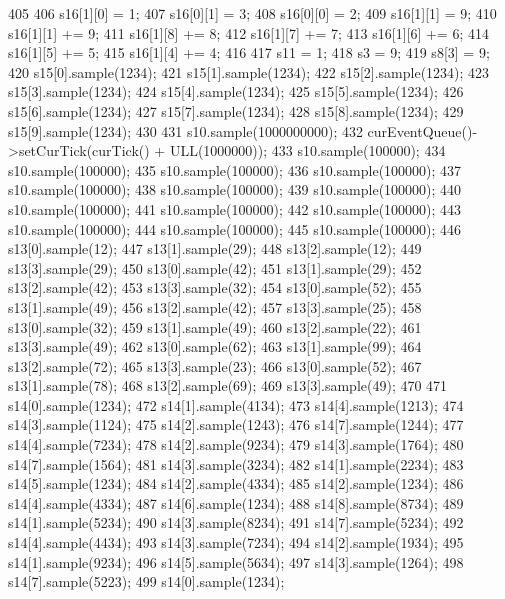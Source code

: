 \begin{DoxyCode}
405 {
406     s16[1][0] = 1;
407     s16[0][1] = 3;
408     s16[0][0] = 2;
409     s16[1][1] = 9;
410     s16[1][1] += 9;
411     s16[1][8] += 8;
412     s16[1][7] += 7;
413     s16[1][6] += 6;
414     s16[1][5] += 5;
415     s16[1][4] += 4;
416 
417     s11 = 1;
418     s3 = 9;
419     s8[3] = 9;
420     s15[0].sample(1234);
421     s15[1].sample(1234);
422     s15[2].sample(1234);
423     s15[3].sample(1234);
424     s15[4].sample(1234);
425     s15[5].sample(1234);
426     s15[6].sample(1234);
427     s15[7].sample(1234);
428     s15[8].sample(1234);
429     s15[9].sample(1234);
430 
431     s10.sample(1000000000);
432     curEventQueue()->setCurTick(curTick() + ULL(1000000));
433     s10.sample(100000);
434     s10.sample(100000);
435     s10.sample(100000);
436     s10.sample(100000);
437     s10.sample(100000);
438     s10.sample(100000);
439     s10.sample(100000);
440     s10.sample(100000);
441     s10.sample(100000);
442     s10.sample(100000);
443     s10.sample(100000);
444     s10.sample(100000);
445     s10.sample(100000);
446     s13[0].sample(12);
447     s13[1].sample(29);
448     s13[2].sample(12);
449     s13[3].sample(29);
450     s13[0].sample(42);
451     s13[1].sample(29);
452     s13[2].sample(42);
453     s13[3].sample(32);
454     s13[0].sample(52);
455     s13[1].sample(49);
456     s13[2].sample(42);
457     s13[3].sample(25);
458     s13[0].sample(32);
459     s13[1].sample(49);
460     s13[2].sample(22);
461     s13[3].sample(49);
462     s13[0].sample(62);
463     s13[1].sample(99);
464     s13[2].sample(72);
465     s13[3].sample(23);
466     s13[0].sample(52);
467     s13[1].sample(78);
468     s13[2].sample(69);
469     s13[3].sample(49);
470 
471     s14[0].sample(1234);
472     s14[1].sample(4134);
473     s14[4].sample(1213);
474     s14[3].sample(1124);
475     s14[2].sample(1243);
476     s14[7].sample(1244);
477     s14[4].sample(7234);
478     s14[2].sample(9234);
479     s14[3].sample(1764);
480     s14[7].sample(1564);
481     s14[3].sample(3234);
482     s14[1].sample(2234);
483     s14[5].sample(1234);
484     s14[2].sample(4334);
485     s14[2].sample(1234);
486     s14[4].sample(4334);
487     s14[6].sample(1234);
488     s14[8].sample(8734);
489     s14[1].sample(5234);
490     s14[3].sample(8234);
491     s14[7].sample(5234);
492     s14[4].sample(4434);
493     s14[3].sample(7234);
494     s14[2].sample(1934);
495     s14[1].sample(9234);
496     s14[5].sample(5634);
497     s14[3].sample(1264);
498     s14[7].sample(5223);
499     s14[0].sample(1234);
}
\end{DoxyCode}
